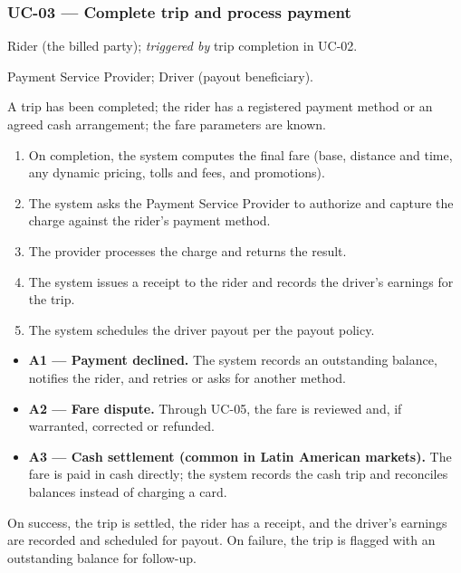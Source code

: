 \subsubsection*{UC-03 --- Complete trip and process payment}

\begin{description}[leftmargin=2.4cm,style=nextline,font=\normalfont\bfseries]
  \item[Primary actor] Rider (the billed party); \emph{triggered by} trip
        completion in UC-02.
  \item[Secondary actors] Payment Service Provider; Driver (payout
        beneficiary).
  \item[Preconditions] A trip has been completed; the rider has a registered
        payment method or an agreed cash arrangement; the fare parameters are
        known.
  \item[Main flow]
    \begin{enumerate}[leftmargin=1.6em,itemsep=0.15em]
      \item On completion, the system computes the final fare (base, distance
            and time, any dynamic pricing, tolls and fees, and promotions).
      \item The system asks the Payment Service Provider to authorize and
            capture the charge against the rider's payment method.
      \item The provider processes the charge and returns the result.
      \item The system issues a receipt to the rider and records the driver's
            earnings for the trip.
      \item The system schedules the driver payout per the payout policy.
    \end{enumerate}
  \item[Alternative flows]
    \begin{itemize}[leftmargin=1.6em,itemsep=0.15em]
      \item \textbf{A1 --- Payment declined.} The system records an
            outstanding balance, notifies the rider, and retries or asks for
            another method.
      \item \textbf{A2 --- Fare dispute.} Through UC-05, the fare is reviewed
            and, if warranted, corrected or refunded.
      \item \textbf{A3 --- Cash settlement (common in Latin American
            markets).} The fare is paid in cash directly; the system records
            the cash trip and reconciles balances instead of charging a card.
    \end{itemize}
  \item[Postconditions] On success, the trip is settled, the rider has a
        receipt, and the driver's earnings are recorded and scheduled for
        payout. On failure, the trip is flagged with an outstanding balance
        for follow-up.
\end{description}


